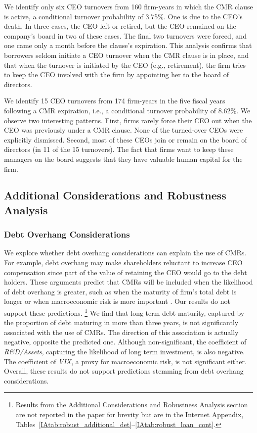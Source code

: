 \documentclass[a4paper,12pt]{article}
\begin{document}
We identify only six CEO turnovers from 160 firm-years in which the CMR clause is active, a conditional turnover probability of 3.75\%.
One is due to the CEO's death.
In three cases, the CEO left or retired, but the CEO remained on the company's board in two of these cases.
The final two turnovers were forced, and one came only a month before the clause's expiration.
This analysis confirms that borrowers seldom initiate a CEO turnover when the CMR clause is in place, and that when the turnover is initiated by the CEO (e.g., retirement), the firm tries to keep the CEO involved with the firm by appointing her to the board of directors.


We identify 15 CEO turnovers from 174 firm-years in the five fiscal years following a CMR expiration, i.e., a conditional turnover probability of 8.62\%.
We observe two interesting patterns.
First, firms rarely force their CEO out when the CEO was previously under a CMR clause.
None of the turned-over CEOs were explicitly dismissed.
Second, most of these CEOs join or remain on the board of directors (in 11 of the 15 turnovers).
The fact that firms want to keep these managers on the board suggests that they have valuable human capital for the firm.




\subsection{Additional Considerations and Robustness Analysis}


\subsubsection{Debt Overhang Considerations}

We explore whether debt overhang considerations can explain the use of CMRs. 
For example, debt overhang may make shareholders reluctant to increase CEO compensation since part of the value of retaining the CEO would go to the debt holders. 
These arguments predict that CMRs will be included when the likelihood of debt overhang is greater, such as when the maturity of firm's total debt is longer \citep{Myers_1977} or when macroeconomic risk is more important \citep{Chen_2017}. 
Our results do not support these predictions.%
    \footnote{Results from the Additional Considerations and Robustness Analysis section are not reported in the paper for brevity but are in the Internet Appendix, Tables~\ref{IAtab:robust_additional_det}--\ref{IAtab:robust_loan_cont}.}
We find that long term debt maturity, captured by the proportion of debt maturing in more than three years, is not significantly associated with the use of CMRs.
The direction of this association is actually negative, opposite the predicted one.
Although non-significant, the coefficient of \textit{R\&D/Assets}, capturing the likelihood of long term investment, is also negative.
The coefficient of \textit{VIX}, a proxy for macroeconomic risk, is not significant either.
Overall, these results do not support predictions stemming from debt overhang considerations.
\end{document}
